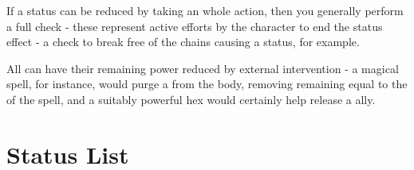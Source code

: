 If a status can be reduced by taking an whole action, then you generally perform a full  check - these represent active efforts by the character to end the status effect - a  check to break free of the chains causing a  status, for example. 

All  can have their remaining power reduced by external intervention - a magical  spell, for instance, would purge a  from the body, removing remaining   equal to the  of the spell, and a suitably powerful  hex would certainly help release a  ally. 


\section{Status List}

\newcommand\status[3]
{
	\subsubsection{#1}
	
	{\it #2}
	
	\begin{itemize}
	\renewcommand\labelitemi{\minus{}}
		#3
	\end{itemize}
}








